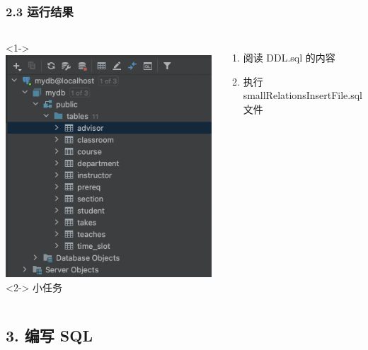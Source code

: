 \documentclass[aspectratio=169, 14pt]{beamer}
\begin{document}
\begin{frame}
    \frametitle{2.3 运行结果}
    \begin{columns}
        <1->
        \includegraphics[height=.8\paperheight]{week4/result}   
        <2->
        小任务
        \begin{enumerate}
            \item 阅读 DDL.sql 的内容
            \item 执行 smallRelationsInsertFile.sql 文件
        \end{enumerate}
    \end{columns}
\end{frame}

\begin{frame}

    \section{\textcolor{darkmidnightblue}{3. 编写 SQL}} 

\end{frame}
\end{document}
